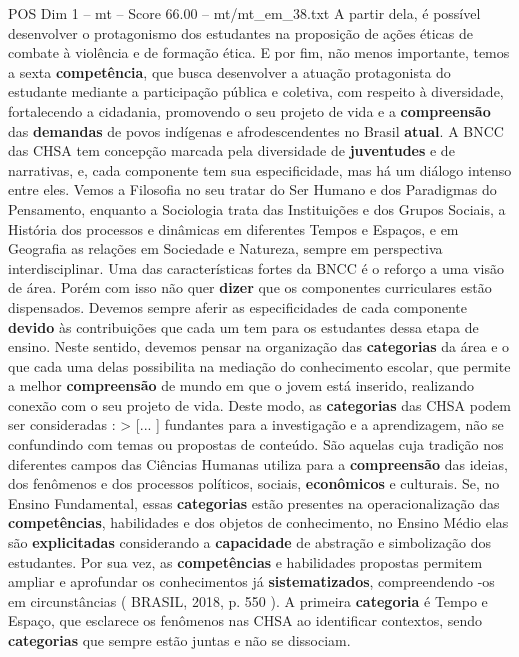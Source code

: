 \begin{textsample}{POS Dim 1 – mt – Score 66.00 – mt/mt\_em\_38.txt}
A partir dela, é possível desenvolver o protagonismo dos estudantes na proposição de ações éticas de combate à violência e de formação ética.
E por fim, não menos importante, temos a sexta \textbf{competência}, que busca desenvolver a atuação protagonista do estudante mediante a participação pública e coletiva, com respeito à diversidade, fortalecendo a cidadania, promovendo o seu projeto de vida e a \textbf{compreensão} das \textbf{demandas} de povos indígenas e afrodescendentes no Brasil \textbf{atual}.
A BNCC das CHSA tem concepção marcada pela diversidade de \textbf{juventudes} e de narrativas, e, cada componente tem sua especificidade, mas há um diálogo intenso entre eles.
Vemos a Filosofia no seu tratar do Ser Humano e dos Paradigmas do Pensamento, enquanto a Sociologia trata das Instituições e dos Grupos Sociais, a História dos processos e dinâmicas em diferentes Tempos e Espaços, e em Geografia as relações em Sociedade e Natureza, sempre em perspectiva interdisciplinar.
Uma das características fortes da BNCC é o reforço a uma visão de área.
Porém com isso não quer \textbf{dizer} que os componentes curriculares estão dispensados.
Devemos sempre aferir as especificidades de cada componente \textbf{devido} às contribuições que cada um tem para os estudantes dessa etapa de ensino.
Neste sentido, devemos pensar na organização das \textbf{categorias} da área e o que cada uma delas possibilita na mediação do conhecimento escolar, que permite a melhor \textbf{compreensão} de mundo em que o jovem está inserido, realizando conexão com o seu projeto de vida.
Deste modo, as \textbf{categorias} das CHSA podem ser consideradas : > [... ] fundantes para a investigação e a aprendizagem, não se confundindo com temas ou propostas de conteúdo.
São aquelas cuja tradição nos diferentes campos das Ciências Humanas utiliza para a \textbf{compreensão} das ideias, dos fenômenos e dos processos políticos, sociais, \textbf{econômicos} e culturais.
Se, no Ensino Fundamental, essas \textbf{categorias} estão presentes na operacionalização das \textbf{competências}, habilidades e dos objetos de conhecimento, no Ensino Médio elas são \textbf{explicitadas} considerando a \textbf{capacidade} de abstração e simbolização dos estudantes.
Por sua vez, as \textbf{competências} e habilidades propostas permitem ampliar e aprofundar os conhecimentos já \textbf{sistematizados}, compreendendo -os em circunstâncias ( BRASIL, 2018, p. 550 ).
A primeira \textbf{categoria} é Tempo e Espaço, que esclarece os fenômenos nas CHSA ao identificar contextos, sendo \textbf{categorias} que sempre estão juntas e não se dissociam.

\end{textsample}
